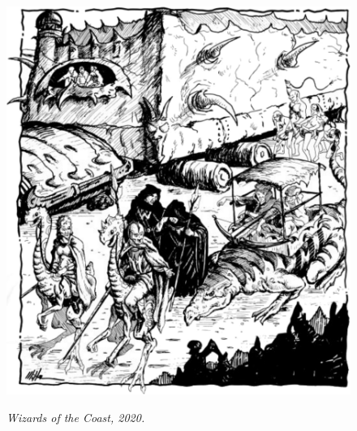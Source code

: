 \begin{figure}[t!]
\centering
\includegraphics[width=\textwidth-15mm]{images/caravan-3.png}
\par\textit{\small\textcopyright Wizards of the Coast, 2020.}
\end{figure}

